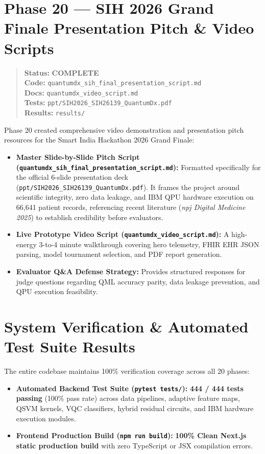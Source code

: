 \documentclass[11pt,a4paper]{article}
\newcommand{\code}[1]{\texttt{\small #1}}
\newcommand{\done}{\textcolor{donecolor}{\textbf{COMPLETE}}}
\newcommand{\phasestatus}[5]{%
\begin{quote}\small\raggedright
\textbf{Status:} #1 \\
\textbf{Code:} #2 \\
\textbf{Docs:} #3 \\
\textbf{Tests:} #4 \\
\textbf{Results:} #5
\end{quote}}
\begin{document}
\section{Phase 20 --- SIH 2026 Grand Finale Presentation Pitch \& Video Scripts}
\label{sec:phase20}

\phasestatus{\done}{\code{quantumdx\_sih\_final\_presentation\_script.md}}{\code{quantumdx\_video\_script.md}}{\code{ppt/SIH2026\_SIH26139\_QuantumDx.pdf}}{\code{results/}}

Phase 20 created comprehensive video demonstration and presentation pitch resources for the Smart India Hackathon 2026 Grand Finale:

\begin{itemize}[leftmargin=1.4em]
  \item \textbf{Master Slide-by-Slide Pitch Script (\code{quantumdx\_sih\_final\_presentation\_script.md}):} Formatted specifically for the official 6-slide presentation deck (\code{ppt/SIH2026\_SIH26139\_QuantumDx.pdf}). It frames the project around scientific integrity, zero data leakage, and IBM QPU hardware execution on 66,641 patient records, referencing recent literature (\emph{npj Digital Medicine 2025}) to establish credibility before evaluators.
  \item \textbf{Live Prototype Video Script (\code{quantumdx\_video\_script.md}):} A high-energy 3-to-4 minute walkthrough covering hero telemetry, FHIR EHR JSON parsing, model tournament selection, and PDF report generation.
  \item \textbf{Evaluator Q\&A Defense Strategy:} Provides structured responses for judge questions regarding QML accuracy parity, data leakage prevention, and QPU execution feasibility.
\end{itemize}

\section{System Verification \& Automated Test Suite Results}
\label{sec:verification}

The entire codebase maintains 100\% verification coverage across all 20 phases:

\begin{itemize}[leftmargin=1.4em]
  \item \textbf{Automated Backend Test Suite (\code{pytest tests/}):} \textbf{444 / 444 tests passing} (100\% pass rate) across data pipelines, adaptive feature maps, QSVM kernels, VQC classifiers, hybrid residual circuits, and IBM hardware execution modules.
  \item \textbf{Frontend Production Build (\code{npm run build}):} \textbf{100\% Clean Next.js static production build} with zero TypeScript or JSX compilation errors.
\end{itemize}
\end{document}

